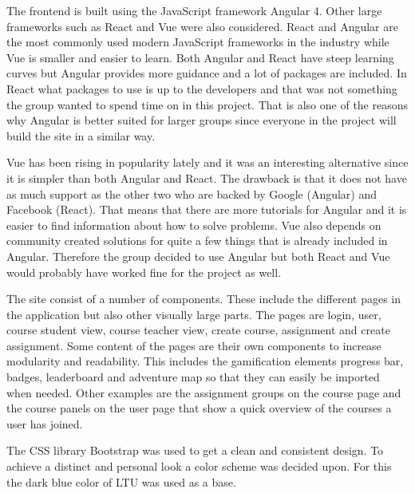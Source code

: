 The frontend is built using the JavaScript framework Angular 4. Other large frameworks such as React and Vue were also considered. React and Angular are the most commonly used modern JavaScript frameworks in the industry while Vue is smaller and easier to learn. Both Angular and React have steep learning curves but Angular provides more guidance and a lot of packages are included. In React what packages to use is up to the developers and that was not something the group wanted to spend time on in this project. That is also one of the reasons why Angular is better suited for larger groups since everyone in the project will build the site in a similar way. 

Vue has been rising in popularity lately and it was an interesting alternative since it is simpler than both Angular and React. The drawback is that it does not have as much support as the other two who are backed by Google (Angular) and Facebook (React). That means that there are more tutorials for Angular and it is easier to find information about how to solve problems. Vue also depends on community created solutions for quite a few things that is already included in Angular. Therefore the group decided to use Angular but both React and Vue would probably have worked fine for the project as well.

The site consist of a number of components. These include the different pages in the application but also other visually large parts. The pages are login, user, course student view, course teacher view, create course, assignment and create assignment. Some content of the pages are their own components to increase modularity and readability. This includes the gamification elements progress bar, badges, leaderboard and adventure map so that they can easily be imported when needed. Other examples are the assignment groups on the course page and the course panels on the user page that show a quick overview of the courses a user has joined. 

The CSS library Bootstrap was used to get a clean and consistent design. To achieve a distinct and personal look a color scheme was decided upon. For this the dark blue color of LTU was used as a base.

